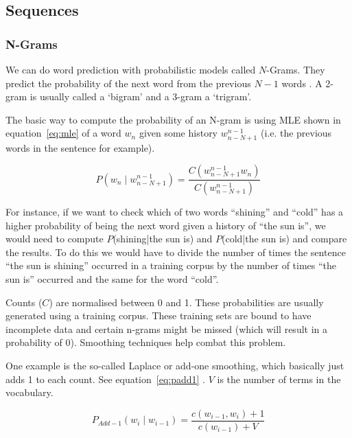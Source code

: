\subsection{Sequences}


\subsubsection{N-Grams}
\label{s:ngrams}

We can do word prediction with probabilistic models called $N$-Grams. They predict the probability of the next word from the previous $N-1$ words \autocite{Jurafsky2009}. A 2-gram is usually called a `bigram' and a 3-gram a `trigram'.

The basic way to compute the probability of an N-gram is using \ac{MLE} shown in equation~\ref{eq:mle}\sidepar{$\bm{\Sigma}$~\ref{eq:mle}} \autocite{Jurafsky2009} of a word $w_n$ given some history $w_{n-N+1}^{n-1}$ (i.e. the previous words in the sentence for example).

\begin{equation}
  P(w_n \mid w_{n-N+1}^{n-1}) = \frac{C(w_{n-N+1}^{n-1} w_n)}{C(w_{n-N+1}^{n-1})}
  \label{eq:mle}
\end{equation}

For instance, if we want to check which of two words ``shining'' and ``cold'' has a higher probability of being the next word given a history of ``the sun is'', we would need to compute $P$(shining|the sun is) and $P$(cold|the sun is) and compare the results. To do this we would have to divide the number of times the sentence ``the sun is shining'' occurred in a training corpus by the number of times ``the sun is'' occurred and the same for the word ``cold''.

Counts ($C$) are normalised between 0 and 1. These probabilities are usually generated using a training corpus. These training sets are bound to have incomplete data and certain n-grams might be missed (which will result in a probability of 0). Smoothing techniques help combat this problem. 

One example is the so-called Laplace or add-one smoothing, which basically just adds 1 to each count. See equation~\ref{eq:padd1}\sidepar{$\bm{\Sigma}$~\ref{eq:padd1}} \autocite{Jurafsky2009}. $V$ is the number of terms in the vocabulary.

\begin{equation}
  P_{Add-1}(w_i \mid w_{i-1}) = \frac{c(w_{i-1}, w_i) + 1}{c(w_{i-1}) + V}
  \label{eq:padd1}
\end{equation}

